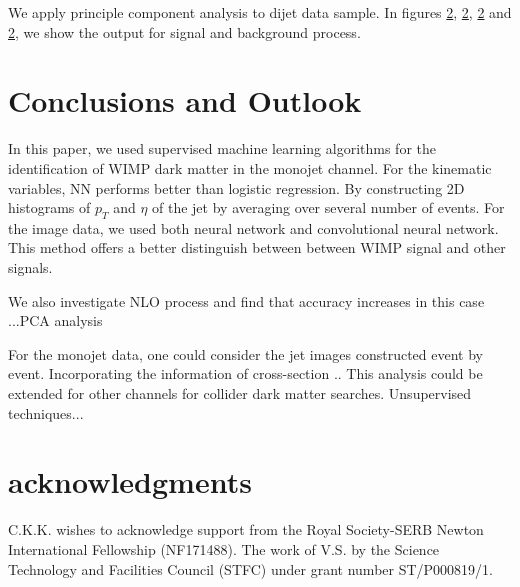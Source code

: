 \documentclass[aps,onecolumn,showpacs,superscriptaddress,groupedaddress,nofootinbib,preprint]{revtex4-1}
\begin{document}
We apply  principle component analysis to dijet data sample. In figures \ref{}, \ref{}, \ref{} and \ref{}, we show the output for signal and background process.


\section{Conclusions and Outlook}
In this paper, we used supervised machine learning algorithms for the identification of WIMP dark matter in the monojet channel. For the kinematic variables, 
NN performs better than logistic regression. By constructing 2D histograms of $p_T$ and $\eta$ of the jet by averaging over several number of events. For the 
image data, we used both neural network and convolutional neural network. This method offers a better distinguish between between WIMP signal and other signals. 

We also investigate NLO process and find that accuracy increases in this case ...PCA analysis

For the monojet data, one could consider the jet images constructed event by event. Incorporating the information of cross-section ..
This analysis could be extended for other channels for collider dark matter searches. 
Unsupervised techniques...

\section{acknowledgments}
C.K.K. wishes to acknowledge support from the Royal Society-SERB Newton International Fellowship (NF171488). 
The work of V.S. by the Science Technology and Facilities Council (STFC) under grant number
ST/P000819/1.

\appendix
\end{document}
